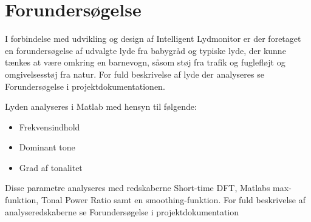 \section{Forundersøgelse}
I forbindelse med udvikling og design af Intelligent Lydmonitor er der foretaget en forundersøgelse af udvalgte lyde fra babygråd og typiske lyde, der kunne tænkes at være omkring en barnevogn, såsom støj fra trafik og fuglefløjt og omgivelsesstøj fra natur. For fuld beskrivelse af lyde der analyseres se Forundersøgelse i projektdokumentationen. 


Lyden analyseres i Matlab med hensyn til følgende: 
\begin{itemize}
\item Frekvensindhold
\item Dominant tone
\item Grad af tonalitet
\end{itemize}

Disse parametre analyseres med redskaberne Short-time DFT, Matlabs max-funktion, Tonal Power Ratio samt en smoothing-funktion. For fuld beskrivelse af analyseredskaberne se Forundersøgelse i projektdokumentation 


